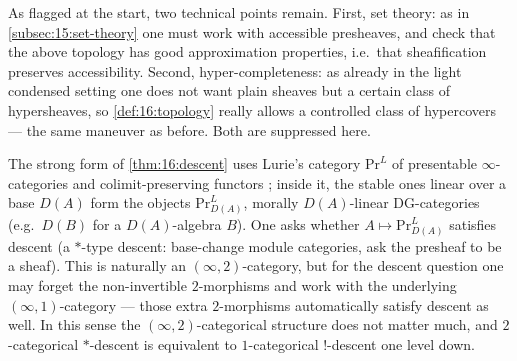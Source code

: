 \begin{remark}
\label{rmk:16:caveats}
As flagged at the start, two technical points remain. First, set theory: as in
\cref{subsec:15:set-theory} one must work with accessible presheaves, and check that the
above topology has good approximation properties, i.e.\ that sheafification preserves
accessibility. Second, hyper-completeness: as already in the light condensed setting one
does not want plain sheaves but a certain class of hypersheaves, so
\cref{def:16:topology} really allows a controlled class of hypercovers --- the same
maneuver as before. Both are suppressed here.
\end{remark}

\begin{remark}
\label{rmk:16:2cat-descent}
The strong form of \cref{thm:16:descent} uses Lurie's category $\mathrm{Pr}^L$ of
presentable $\infty$-categories and colimit-preserving functors \cite{lurie2017higher};
inside it, the stable ones linear over a base $D(A)$ form the objects
$\mathrm{Pr}^L_{D(A)}$, morally $D(A)$-linear DG-categories (e.g.\ $D(B)$ for a
$D(A)$-algebra $B$). One asks whether $A\mapsto\mathrm{Pr}^L_{D(A)}$ satisfies descent
(a $*$-type descent: base-change module categories, ask the presheaf to be a sheaf).
This is naturally an $(\infty,2)$-category, but for the descent question one may forget
the non-invertible $2$-morphisms and work with the underlying $(\infty,1)$-category ---
those extra $2$-morphisms automatically satisfy descent as well. In this sense the
$(\infty,2)$-categorical structure does not matter much, and $2$-categorical
$*$-descent is equivalent to $1$-categorical $!$-descent one level down.
\end{remark}
